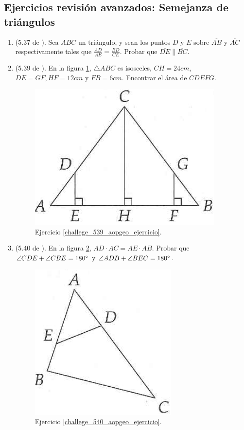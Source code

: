 \begin{center}
	\vspace{-1cm}
	\section{ Ejercicios revisión avanzados: Semejanza de triángulos}
\end{center}
\begin{enumerate}
	\item \label{challege_537_aopgeo_ejercicio} (5.37 de \cite{Aops_Geometria}). Sea $ABC$ un triángulo, y sean los puntos $D$ y $E$ sobre $\overline{AB}$ y $\overline{AC}$ respectivamente tales que $\frac{AD}{AE}=\frac{BD}{CE}$. Probar que $\overline{DE} \parallel \overline{BC}$.
	
	\item \label{challege_539_aopgeo_ejercicio}(5.39 de \cite{Aops_Geometria}). En la figura \ref{challege_539_aopgeo_ejer}, $\triangle ABC$ es isosceles, $CH=24cm$, $DE=GF,HF=12cm$ y $FB=6cm$. Encontrar el área de $CDEFG$.
	\begin{figure}[H]
		\centering
		\includegraphics[width=0.4\linewidth]{Geometria/imgs/challege_539_aopgeo_ejer}
		\caption{Ejercicio \ref{challege_539_aopgeo_ejercicio}.}
		\label{challege_539_aopgeo_ejer}
	\end{figure}

	\item \label{challege_540_aopgeo_ejercicio}(5.40 de \cite{Aops_Geometria}). En la figura \ref{challege_540_aopgeo_ejer}, $AD\cdot AC =AE\cdot AB$. Probar que $\angle CDE + \angle CBE = 180\degree$ y $\angle ADB + \angle BEC = 180\degree$.
	\begin{figure}[H]
		\centering
		\includegraphics[width=0.3\linewidth]{Geometria/imgs/challege_540_aopgeo_ejer}
		\caption{Ejercicio \ref{challege_540_aopgeo_ejercicio}.}
		\label{challege_540_aopgeo_ejer}
	\end{figure}
	

\end{enumerate}
